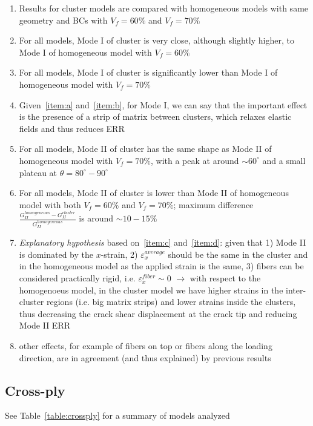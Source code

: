 \documentclass[review]{elsarticle}
\begin{document}
\begin{enumerate}
\item Results for cluster models are compared with homogeneous models with same geometry and BCs with $V_{f}=60\%$ and $V_{f}=70\%$
\item \label{item:a} For all models, Mode I of cluster is very close, although slightly higher, to Mode I of homogeneous model with $V_{f}=60\%$
\item \label{item:b} For all models, Mode I of cluster is significantly lower than Mode I of homogeneous model with $V_{f}=70\%$
\item Given~\ref{item:a} and~\ref{item:b}, for Mode I, we can say that the important effect is the presence of a strip of matrix between clusters, which relaxes elastic fields and thus reduces ERR
\item \label{item:c} For all models, Mode II of cluster has the same shape as Mode II of homogeneous model with $V_{f}=70\%$, with a peak at around $\sim60^{\circ}$ and a small plateau at $\theta=80^{\circ}-90^{\circ}$
\item \label{item:d} For all models, Mode II of cluster is lower than Mode II of homogeneous model with both $V_{f}=60\%$ and $V_{f}=70\%$; maximum difference $\frac{G_{II}^{homogeneous}-G_{II}^{cluster}}{G_{II}^{homogeneous}}$ is around $\sim10-15\%$
\item \emph{Explanatory hypothesis} based on~\ref{item:c} and~\ref{item:d}: given that 1) Mode II is dominated by the $x$-strain, 2) $\varepsilon_{x}^{average}$ should be the same in the cluster and in the homogeneous model as the applied strain is the same, 3) fibers can be considered practically rigid, i.e. $\varepsilon_{x}^{fiber}\sim0$ $\longrightarrow$ with respect to the homogenoeus model, in the cluster model we have higher strains in the inter-cluster regions (i.e. big matrix strips) and lower strains inside the clusters, thus decreasing the crack shear displacement at the crack tip and reducing Mode II ERR
\item other effects, for example of fibers on top or fibers along the loading direction, are in agreement (and thus explained) by previous results
\end{enumerate}

\subsection{Cross-ply}\label{subsec:crossply}

See Table~\ref{table:crossply} for a summary of models analyzed
\end{document}
